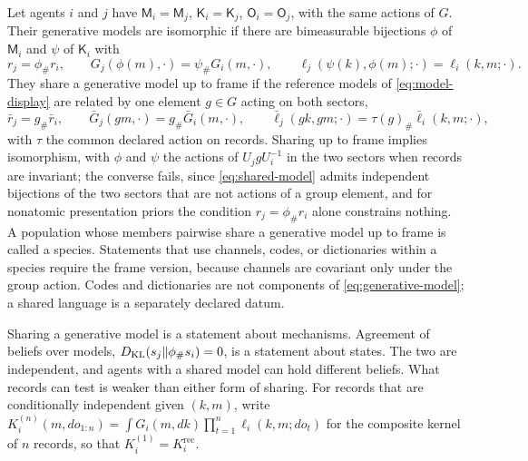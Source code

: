 Let agents $i$ and $j$ have $\mathsf M_i=\mathsf M_j$, $\mathsf K_i=\mathsf K_j$, $\mathsf O_i=\mathsf O_j$, with the same actions of $G$. Their generative models are isomorphic if there are bimeasurable bijections $\phi$ of $\mathsf M_i$ and $\psi$ of $\mathsf K_i$ with
\begin{equation}
 r_j=\phi_\#r_i,\qquad
 G_j(\phi(m),\cdot)=\psi_\#G_i(m,\cdot),\qquad
 \ell_j(\psi(k),\phi(m);\cdot)=\ell_i(k,m;\cdot).
 \label{eq:shared-model}
\end{equation}
They share a generative model up to frame if the reference models of \cref{eq:model-display} are related by one element $g\in G$ acting on both sectors,
\begin{equation}
 \bar r_j=g_\#\bar r_i,\qquad
 \bar G_j(gm,\cdot)=g_\#\bar G_i(m,\cdot),\qquad
 \bar\ell_j(gk,gm;\cdot)=\tau(g)_\#\bar\ell_i(k,m;\cdot),
 \label{eq:shared-model-frame}
\end{equation}
with $\tau$ the common declared action on records. Sharing up to frame implies isomorphism, with $\phi$ and $\psi$ the actions of $U_jgU_i^{-1}$ in the two sectors when records are invariant; the converse fails, since \cref{eq:shared-model} admits independent bijections of the two sectors that are not actions of a group element, and for nonatomic presentation priors the condition $r_j=\phi_\#r_i$ alone constrains nothing. A population whose members pairwise share a generative model up to frame is called a species. Statements that use channels, codes, or dictionaries within a species require the frame version, because channels are covariant only under the group action. Codes and dictionaries are not components of \cref{eq:generative-model}; a shared language is a separately declared datum.

Sharing a generative model is a statement about mechanisms. Agreement of beliefs over models, $D_{\mathrm{KL}}(s_j\Vert\phi_\#s_i)=0$, is a statement about states. The two are independent, and agents with a shared model can hold different beliefs. What records can test is weaker than either form of sharing. For records that are conditionally independent given $(k,m)$, write $K_i^{(n)}(m,do_{1:n})=\int G_i(m,dk)\prod_{t=1}^n\ell_i(k,m;do_t)$ for the composite kernel of $n$ records, so that $K_i^{(1)}=K_i^{\mathrm{rec}}$.


